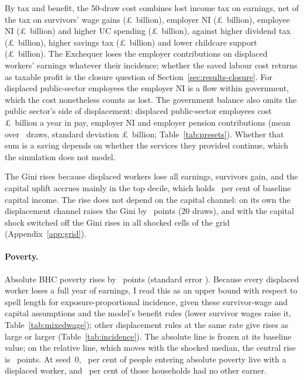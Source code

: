 By tax and benefit, the 50-draw cost combines lost income tax on earnings, net of the tax on survivors' wage gains (\pounds\genCostOtherIncomeTaxAbsBn~billion), employer NI (\pounds\genCostEmployerNiAbsBn~billion), employee NI (\pounds\genCostEmployeeNiAbsBn~billion) and higher UC spending (\pounds\genCostUcAbsBn~billion), against higher dividend tax (\pounds\genCostDividendTaxAbsBn~billion), higher savings tax (\pounds\genCostSavingsTaxAbsBn~billion) and lower childcare support (\pounds\genCostChildcareAbsBn~billion). The Exchequer loses the employer contributions on displaced workers' earnings whatever their incidence; whether the saved labour cost returns as taxable profit is the closure question of Section~\ref{sec:results-closure}. For displaced public-sector employees the employer NI is a flow within government, which the cost nonetheless counts as lost. The government balance also omits the public sector's side of displacement: displaced public-sector employees cost \pounds\genCentralPaybillMeanBn~billion a year in pay, employer NI and employer pension contributions (mean over \genCentralPaybillDraws~draws, standard deviation \pounds\genCentralPaybillSdBn~billion; Table~\ref{tab:presets}). Whether that sum is a saving depends on whether the services they provided continue, which the simulation does not model.

The Gini rises because displaced workers lose all earnings, survivors gain, and the capital uplift accrues mainly in the top decile, which holds \genCapTopSharePct~per cent of baseline capital income. The rise does not depend on the capital channel: on its own the displacement channel raises the Gini by \genChannelMcDispGiniAbsPp~points (20 draws), and with the capital shock switched off the Gini rises in all \genAppGridNoCapGiniPositive{} shocked cells of the grid (Appendix~\ref{app:grid}).

\paragraph{Poverty.} Absolute BHC poverty rises by \genCentralMcPovBhcMeanPp~points (standard error \genCentralMcPovBhcSePp). Because every displaced worker loses a full year of earnings, I read this as an upper bound with respect to spell length for exposure-proportional incidence, given these survivor-wage and capital assumptions and the model's benefit rules (lower survivor wages raise it, Table~\ref{tab:mixedwage}); other displacement rules at the same rate give rises as large or larger (Table~\ref{tab:incidence}). The absolute line is frozen at its baseline value; on the relative line, which moves with the shocked median, the central rise is \genCentralMcRelPovBhcMeanPp~points. At seed~0, \genPovInDisplacedHhPct~per cent of people entering absolute poverty live with a displaced worker, and \genPovSoleEarnerPct~per cent of those households had no other earner.

